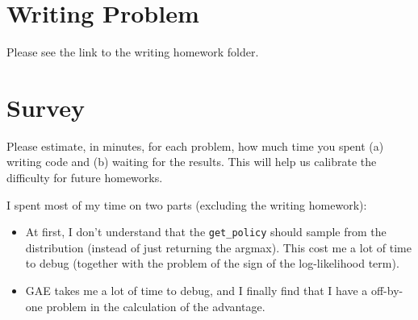 \documentclass{article}
\begin{document}
\section{Writing Problem}

\MYSOLUTION

Please see the link to the writing homework folder.


\setcounter{section}{8}
\newpage\section{Survey}
\label{sec:survey}
Please estimate, in minutes, for each problem, how much time you spent (a) writing code and (b) waiting for the results. This will help us calibrate the difficulty for future homeworks. 

\MYSOLUTION

I spent most of my time on two parts (excluding the writing homework):

\begin{itemize}
        \item At first, I don't understand that the \verb|get_policy| should sample from the distribution (instead of just returning the argmax). This cost me a lot of time to debug (together with the problem of the sign of the log-likelihood term).
        \item GAE takes me a lot of time to debug, and I finally find that I have a off-by-one problem in the calculation of the advantage.
\end{itemize}
\end{document}
